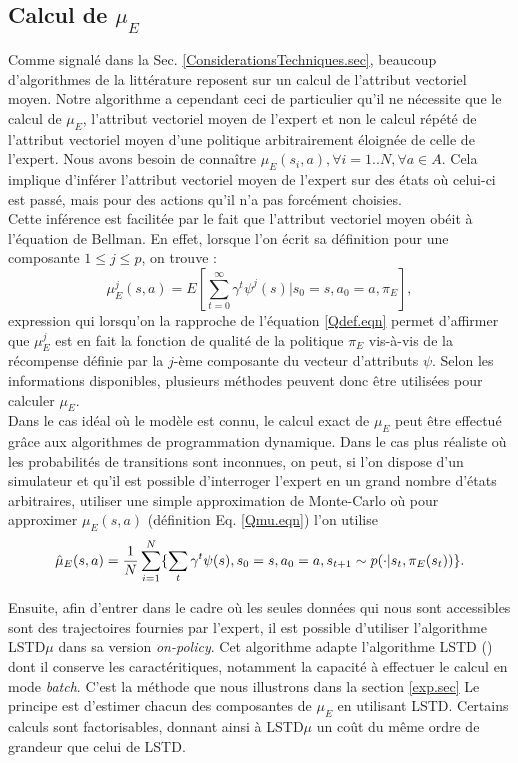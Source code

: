 \documentclass[publibook-draft]{CAp2012}
\begin{document}
\subsection{Calcul de $\mu_E$}
\label{calculmu.sec}
Comme signalé dans la Sec. \ref{ConsiderationsTechniques.sec}, beaucoup d'algorithmes de la littérature reposent sur un calcul de l'attribut vectoriel moyen. Notre algorithme a cependant ceci de particulier qu'il ne nécessite que le calcul de $\mu_E$, l'attribut vectoriel moyen de l'expert et non le calcul répété de l'attribut vectoriel moyen d'une politique arbitrairement éloignée de celle de l'expert. Nous avons besoin de connaître $\mu_E(s_i,a), \forall i= 1..N,\forall a \in A$. Cela implique d'inférer l'attribut vectoriel moyen de l'expert sur des états où celui-ci est passé, mais pour des actions qu'il n'a pas forcément choisies.\\ %

Cette inférence est facilitée par le fait que l'attribut vectoriel moyen obéit à l'équation de Bellman. En effet, lorsque l'on écrit sa définition pour une composante $1\leq j\leq p$, on trouve :
\begin{equation}
\mu_E^j(s,a) = E[\sum\limits_{t=0}^\infty \gamma^t \psi^j(s)|s_0 = s, a_0 = a, \pi_E],
\end{equation}
expression qui lorsqu'on la rapproche de l'équation \eqref{Qdef.eqn} permet d'affirmer que $\mu^j_E$ est en fait la fonction de qualité de la politique $\pi_E$ vis-à-vis de la récompense définie par la $j$-ème composante du vecteur d'attributs $\psi$. Selon les informations disponibles, plusieurs méthodes peuvent donc être utilisées pour calculer $\mu_E$.\\

Dans le cas idéal où le modèle est connu, le calcul exact de $\mu_E$ peut être effectué grâce aux algorithmes de programmation dynamique. Dans le cas plus réaliste où les probabilités de transitions sont inconnues, on peut, si l'on dispose d'un simulateur et qu'il est possible d'interroger l'expert en un grand nombre d'états arbitraires, utiliser une simple approximation de Monte-Carlo où pour approximer $\mu_E(s,a)$ (définition Eq. \eqref{Qmu.eqn}) l'on utilise
\begin{equation}
\hat\mu_E(s,a) = {1\over N}\sum\limits_{i=1}^{N}\{\sum\limits_{t}\gamma^t\psi(s), s_0=s, a_0=a, s_{t+1} \sim p(\cdot|s_t,\pi_E(s_t))\}.
\end{equation}

Ensuite, afin d'entrer dans le cadre où les seules données qui nous sont accessibles sont des trajectoires fournies par l'expert, il est possible d'utiliser l'algorithme LSTD$\mu$ \citep{klein2011batch} dans sa version \emph{on-policy}. Cet algorithme adapte l'algorithme LSTD (\cite{bradtke1996linear}) dont il conserve les caractéritiques, notamment la capacité à effectuer le calcul en mode {\it batch}. C'est la méthode que nous illustrons dans la section \ref{exp.sec} Le principe est d'estimer chacun des composantes de $\mu_E$ en utilisant LSTD. Certains calculs sont factorisables, donnant ainsi à LSTD$\mu$ un coût du même ordre de grandeur que celui de LSTD.\\
\end{document}

